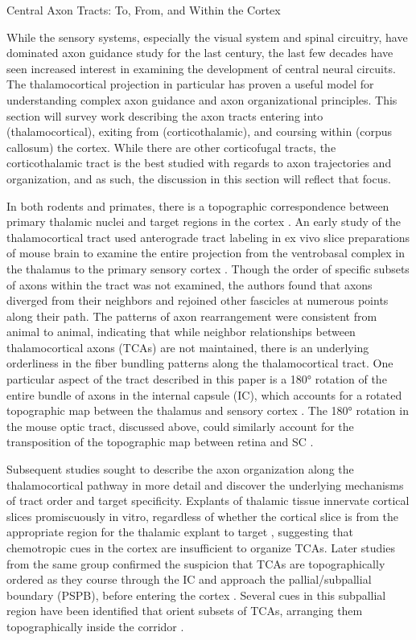 Central Axon Tracts: To, From, and Within the Cortex

While the sensory systems, especially the visual system and spinal circuitry, have dominated axon guidance study for the last century, the last few decades have seen increased interest in examining the development of central neural circuits. 
The thalamocortical projection in particular has proven a useful model for understanding complex axon guidance and axon organizational principles. 
This section will survey work describing the axon tracts entering into (thalamocortical), exiting from (corticothalamic), and coursing within (corpus callosum) the cortex. 
While there are other corticofugal tracts, the corticothalamic tract is the best studied with regards to axon trajectories and organization, and as such, the discussion in this section will reflect that focus. 

In both rodents and primates, there is a topographic correspondence between primary thalamic nuclei and target regions in the cortex \cite{caviness1980tangential, hohl1991topographical}. 
An early study of the thalamocortical tract used anterograde tract labeling in ex vivo slice preparations of mouse brain to examine the entire projection from the ventrobasal complex in the thalamus to the primary sensory cortex \cite{bernardo1987axonal}. 
Though the order of specific subsets of axons within the tract was not examined, the authors found that axons diverged from their neighbors and rejoined other fascicles at numerous points along their path. 
The patterns of axon rearrangement were consistent from animal to animal, indicating that while neighbor relationships between thalamocortical axons (TCAs) are not maintained, there is an underlying orderliness in the fiber bundling patterns along the thalamocortical tract. 
One particular aspect of the tract described in this paper is a 180° rotation of the entire bundle of axons in the internal capsule (IC), which accounts for a rotated topographic map between the thalamus and sensory cortex \cite{bernardo1987axonal}. 
The 180° rotation in the mouse optic tract, discussed above, could similarly account for the transposition of the topographic map between retina and SC \cite{plas2005pretarget}. 

Subsequent studies sought to describe the axon organization along the thalamocortical pathway in more detail and discover the underlying mechanisms of tract order and target specificity. 
Explants of thalamic tissue innervate cortical slices promiscuously in vitro, regardless of whether the cortical slice is from the appropriate region for the thalamic explant to target \cite{molnar1991lack}, suggesting that chemotropic cues in the cortex are insufficient to organize TCAs. 
Later studies from the same group confirmed the suspicion that TCAs are topographically ordered as they course through the IC and approach the pallial/subpallial boundary (PSPB), before entering the cortex \cite{molnar1998mechanisms}. 
Several cues in this subpallial region have been identified that orient subsets of TCAs, arranging them topographically inside the corridor \cite{dufour2003area, powell2008topography, seibt2003neurogenin2}. 

